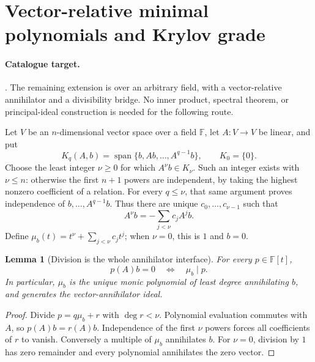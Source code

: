 \documentclass[11pt,a4paper]{article}
\newtheorem{lemma}[theorem]{Lemma}
\theoremstyle{definition}
\newcommand{\F}{\mathbb F}
\DeclareMathOperator{\Span}{span}
\newcommand{\code}[1]{\ifmmode\text{\small\nolinkurl{#1}}\else{\small\nolinkurl{#1}}\fi}
\begin{document}
\section{Vector-relative minimal polynomials and Krylov grade}
\label{struct:grade}
\paragraph{Catalogue target.} \code{krylov-grade}. The remaining extension is
over an arbitrary field, with a vector-relative annihilator and a divisibility
bridge. No inner product, spectral theorem, or principal-ideal construction is
needed for the following route.

Let $V$ be an $n$-dimensional vector space over a field $\F$, let $A:V\to V$
be linear, and put
\[
 K_q(A,b)=\Span\{b,Ab,\ldots,A^{q-1}b\},\qquad K_0=\{0\}.
\]
Choose the least integer $\nu\ge0$ for which $A^\nu b\in K_\nu$.
Such an integer exists with $\nu\le n$: otherwise the first $n+1$ powers
are independent, by taking the highest nonzero coefficient of a relation.
For every $q\le\nu$, that same argument proves independence of
$b,\ldots,A^{q-1}b$. Thus there are unique $c_0,\ldots,c_{\nu-1}$ such that
\[
 A^\nu b=-\sum_{j<\nu}c_j A^j b.
\]
Define $\mu_b(t)=t^\nu+\sum_{j<\nu}c_jt^j$; when $\nu=0$, this is $1$
and $b=0$.

\begin{lemma}[Division is the whole annihilator interface]
For every $p\in\F[t]$,
\[
 p(A)b=0\quad\Longleftrightarrow\quad\mu_b\mid p.
 \tag{S1}
\]
In particular, $\mu_b$ is the unique monic polynomial of least degree
annihilating $b$, and generates the vector-annihilator ideal.
\end{lemma}
\begin{proof}
Divide $p=q\mu_b+r$ with $\deg r<\nu$. Polynomial evaluation commutes with
$A$, so $p(A)b=r(A)b$. Independence of the first $\nu$ powers forces all
coefficients of $r$ to vanish. Conversely a multiple of $\mu_b$ annihilates
$b$. For $\nu=0$, division by $1$ has zero remainder and every polynomial
annihilates the zero vector.
\end{proof}
\end{document}
